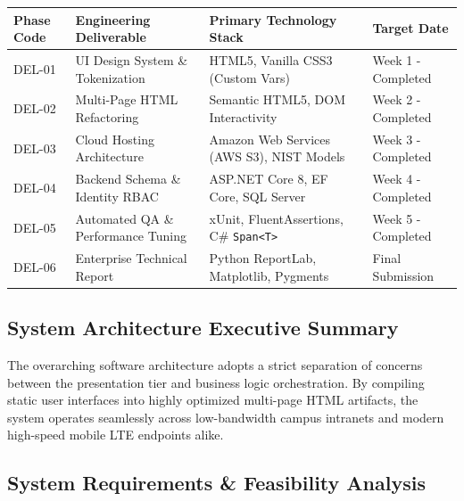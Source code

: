 \documentclass[10pt,journal,compsoc]{IEEEtran}
\begin{document}
\vspace{10pt}
\noindent
\begin{center}
\renewcommand{\arraystretch}{1.3}
\begin{tabular}{|L{2.2cm}|L{5.0cm}|L{4.8cm}|L{3.5cm}|}
\hline
{}
\textbf{\color{white}Phase Code} & \textbf{\color{white}Engineering Deliverable} & \textbf{\color{white}Primary Technology Stack} & \textbf{\color{white}Target Date} \\
\hline
DEL-01 & UI Design System \& Tokenization & HTML5, Vanilla CSS3 (Custom Vars) & Week 1 - Completed \\
\hline
{}
DEL-02 & Multi-Page HTML Refactoring & Semantic HTML5, DOM Interactivity & Week 2 - Completed \\
\hline
DEL-03 & Cloud Hosting Architecture & Amazon Web Services (AWS S3), NIST Models & Week 3 - Completed \\
\hline
{}
DEL-04 & Backend Schema \& Identity RBAC & ASP.NET Core 8, EF Core, SQL Server & Week 4 - Completed \\
\hline
DEL-05 & Automated QA \& Performance Tuning & xUnit, FluentAssertions, C\# \texttt{Span<T>} & Week 5 - Completed \\
\hline
{}
DEL-06 & Enterprise Technical Report & Python ReportLab, Matplotlib, Pygments & Final Submission \\
\hline
\end{tabular}
\end{center}

\subsection{System Architecture Executive Summary}
The overarching software architecture adopts a strict separation of concerns between the presentation tier and business logic orchestration. By compiling static user interfaces into highly optimized multi-page HTML artifacts, the system operates seamlessly across low-bandwidth campus intranets and modern high-speed mobile LTE endpoints alike.

\newpage

\subsection{System Requirements \& Feasibility Analysis}
\end{document}
